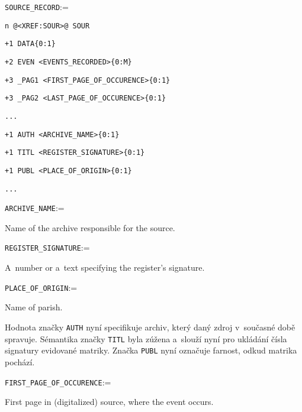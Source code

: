 		\vspace{1em}
		\verb|SOURCE_RECORD|:=\par
		\quad \verb|n @<XREF:SOUR>@ SOUR|\par
		\quad \quad \verb|+1 DATA|\hfill\verb|{0:1}|\par
		\quad \quad \quad \verb|+2 EVEN <EVENTS_RECORDED>|\hfill\verb|{0:M}|\par
		\quad \quad \quad \quad \verb|+3 _PAG1 <FIRST_PAGE_OF_OCCURENCE>|\hfill\verb|{0:1}|\par
		\quad \quad \quad \quad \verb|+3 _PAG2 <LAST_PAGE_OF_OCCURENCE>|\hfill\verb|{0:1}|\par
		\quad \quad \quad \quad \verb|...|\par
		\quad \quad \verb|+1 AUTH <ARCHIVE_NAME>|\hfill\verb|{0:1}|\par
		\quad \quad \verb|+1 TITL <REGISTER_SIGNATURE>|\hfill\verb|{0:1}|\par
		\quad \quad \verb|+1 PUBL <PLACE_OF_ORIGIN>|\hfill\verb|{0:1}|\par
		\quad \quad \verb|...|
		\vspace{1em}
		
		\vspace{1em}
		\verb|ARCHIVE_NAME|:=\par
		\quad Name of the archive responsible for the source.
		\vspace{1em}
		
		\vspace{1em}
		\verb|REGISTER_SIGNATURE|:=\par
		\quad A~number or a~text specifying the register's signature.
		\vspace{1em}
		
		\vspace{1em}
		\verb|PLACE_OF_ORIGIN|:=\par
		\quad Name of parish.
		\vspace{1em}
		
		Hodnota značky \verb|AUTH| nyní specifikuje archiv, který daný zdroj v~současné době spravuje. Sémantika značky \verb|TITL| byla zúžena a~slouží nyní pro ukládání čísla signatury evidované matriky. Značka \verb|PUBL| nyní označuje farnost, odkud matrika pochází. \par
		
		\vspace{1em}
		\verb|FIRST_PAGE_OF_OCCURENCE|:=\par
		\quad First page in (digitalized) source, where the event occurs.
		\vspace{1em}
		
